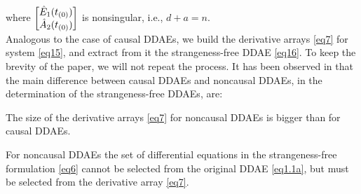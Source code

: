 \documentclass[final,reqno]{siamltex}
\renewenvironment{enumerate}[1]{\begin{compactenum}#1}{\end{compactenum}}
\begin{document}
\ee
%
where $\begin{bmatrix} \hat{E}_{1}(t_{(0)}) \\ \hat{A}_{2}(t_{(0)}) \end{bmatrix}$ is nonsingular, i.e.,  $d+a=n$.\\
Analogous to the case of causal DDAEs, we build the derivative arrays \eqref{eq7} for system \eqref{eq15}, and extract from it the 
strangeness-free DDAE \eqref{eq16}. To keep the brevity of the paper, we will not repeat the process.
It has been observed in \cite{HaM14} that the main difference between causal DDAEs and noncausal DDAEs, in the determination of the 
strangeness-free DDAEs, are:
\begin{enumerate}
 \item[i)] The size of the derivative arrays \eqref{eq7} for noncausal DDAEs is bigger than for causal DDAEs.
 \item[ii)] For noncausal DDAEs the set of differential equations in the strangeness-free formulation \eqref{eq6} cannot be selected from the original DDAE \eqref{eq1.1a}, but must be 
 selected from the derivative array \eqref{eq7}.
\end{enumerate}
\end{document}
